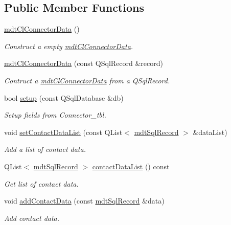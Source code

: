 \subsection*{Public Member Functions}
\begin{DoxyCompactItemize}
\item 
\hyperlink{classmdt_cl_connector_data_a69e30904bf05ecb44183ee5fc66aa377}{mdt\-Cl\-Connector\-Data} ()
\begin{DoxyCompactList}\small\item\em Construct a empty \hyperlink{classmdt_cl_connector_data}{mdt\-Cl\-Connector\-Data}. \end{DoxyCompactList}\item 
\hyperlink{classmdt_cl_connector_data_a48a9a7bdef4b641083055336672d0862}{mdt\-Cl\-Connector\-Data} (const Q\-Sql\-Record \&record)
\begin{DoxyCompactList}\small\item\em Contruct a \hyperlink{classmdt_cl_connector_data}{mdt\-Cl\-Connector\-Data} from a Q\-Sql\-Record. \end{DoxyCompactList}\item 
bool \hyperlink{classmdt_cl_connector_data_a0b198ee358c5abf389b0fac77e7ab732}{setup} (const Q\-Sql\-Database \&db)
\begin{DoxyCompactList}\small\item\em Setup fields from Connector\-\_\-tbl. \end{DoxyCompactList}\item 
void \hyperlink{classmdt_cl_connector_data_a1a3f7803aa42908fb80b30a6554ef2b8}{set\-Contact\-Data\-List} (const Q\-List$<$ \hyperlink{classmdt_sql_record}{mdt\-Sql\-Record} $>$ \&data\-List)
\begin{DoxyCompactList}\small\item\em Add a list of contact data. \end{DoxyCompactList}\item 
Q\-List$<$ \hyperlink{classmdt_sql_record}{mdt\-Sql\-Record} $>$ \hyperlink{classmdt_cl_connector_data_ac7a6caf92298a5520731a60f14c8f4c6}{contact\-Data\-List} () const 
\begin{DoxyCompactList}\small\item\em Get list of contact data. \end{DoxyCompactList}\item 
void \hyperlink{classmdt_cl_connector_data_ad8d4fcc7b07e80fa596e4c803b32e8ce}{add\-Contact\-Data} (const \hyperlink{classmdt_sql_record}{mdt\-Sql\-Record} \&data)
\begin{DoxyCompactList}\small\item\em Add contact data. \end{DoxyCompactList}\item 

\end{DoxyCompactItemize}
